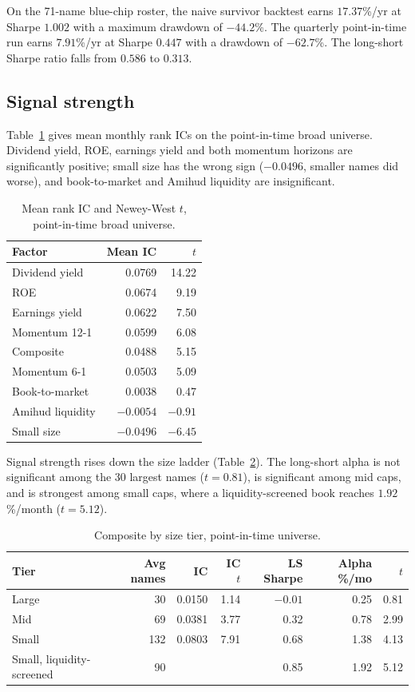\documentclass[11pt,a4paper]{article}
\begin{document}
On the 71-name blue-chip roster, the naive survivor backtest earns $17.37$\%/yr at Sharpe $1.002$ with a maximum drawdown of $-44.2$\%. The quarterly point-in-time run earns $7.91$\%/yr at Sharpe $0.447$ with a drawdown of $-62.7$\%. The long-short Sharpe ratio falls from $0.586$ to $0.313$.

\subsection{Signal strength}
Table~\ref{tab:ic} gives mean monthly rank ICs on the point-in-time broad universe. Dividend yield, ROE, earnings yield and both momentum horizons are significantly positive; small size has the wrong sign ($-0.0496$, smaller names did worse), and book-to-market and Amihud liquidity are insignificant.

\begin{table}[h]
\centering
\caption{Mean rank IC and Newey-West $t$, point-in-time broad universe.}
\label{tab:ic}
\begin{tabular}{lrr}
\toprule
Factor & Mean IC & $t$ \\
\midrule
Dividend yield & 0.0769 & 14.22 \\
ROE & 0.0674 & 9.19 \\
Earnings yield & 0.0622 & 7.50 \\
Momentum 12-1 & 0.0599 & 6.08 \\
Composite & 0.0488 & 5.15 \\
Momentum 6-1 & 0.0503 & 5.09 \\
Book-to-market & 0.0038 & 0.47 \\
Amihud liquidity & $-0.0054$ & $-0.91$ \\
Small size & $-0.0496$ & $-6.45$ \\
\bottomrule
\end{tabular}
\end{table}

Signal strength rises down the size ladder (Table~\ref{tab:tier}). The long-short alpha is not significant among the 30 largest names ($t=0.81$), is significant among mid caps, and is strongest among small caps, where a liquidity-screened book reaches $1.92$\%/month ($t=5.12$).

\begin{table}[h]
\centering
\caption{Composite by size tier, point-in-time universe.}
\label{tab:tier}
\begin{tabular}{lrrrrrr}
\toprule
Tier & Avg names & IC & IC $t$ & LS Sharpe & Alpha \%/mo & $t$ \\
\midrule
Large & 30 & 0.0150 & 1.14 & $-0.01$ & 0.25 & 0.81 \\
Mid & 69 & 0.0381 & 3.77 & 0.32 & 0.78 & 2.99 \\
Small & 132 & 0.0803 & 7.91 & 0.68 & 1.38 & 4.13 \\
Small, liquidity-screened & 90 & & & 0.85 & 1.92 & 5.12 \\
\bottomrule
\end{tabular}
\end{table}
\end{document}
